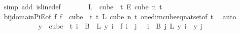 \begin{isabellebody}
\ {\isacharparenleft}{\kern0pt}simp\ add{\isacharcolon}{\kern0pt}\ is{\isacharunderscore}{\kern0pt}line{\isacharunderscore}{\kern0pt}def{\isacharparenright}{\kern0pt}\isanewline
\ \ \ \ \isamarkupfalse%
\ \isamarkupfalse%
\ {\isachardoublequoteopen}{\isacharquery}{\kern0pt}L\ {\isasymin}\ {\isacharparenleft}{\kern0pt}cube\ {}\ t{\isacharparenright}{\kern0pt}\ {\isasymrightarrow}\isactrlsub E\ {\isacharparenleft}{\kern0pt}cube\ n\ t{\isacharparenright}{\kern0pt}{\isachardoublequoteclose}\isanewline
\ \ \ \ \ \ \isamarkupfalse%
\ bij{\isacharunderscore}{\kern0pt}domain{\isacharunderscore}{\kern0pt}PiE{\isacharbrackleft}{\kern0pt}of\ {\isachardoublequoteopen}{\isacharparenleft}{\kern0pt}{\isasymlambda}f{\isachardot}{\kern0pt}\ f\ {}{\isacharparenright}{\kern0pt}{\isachardoublequoteclose}\ {\isachardoublequoteopen}{\isacharparenleft}{\kern0pt}cube\ {}\ t{\isacharparenright}{\kern0pt}{\isachardoublequoteclose}\ {\isachardoublequoteopen}{\isacharbraceleft}{\kern0pt}{\isachardot}{\kern0pt}{\isachardot}{\kern0pt}{\isacharless}{\kern0pt}t{\isacharbraceright}{\kern0pt}{\isachardoublequoteclose}\ {\isachardoublequoteopen}L{\isachardoublequoteclose}\ {\isachardoublequoteopen}cube\ n\ t{\isachardoublequoteclose}{\isacharbrackright}{\kern0pt}\ one{\isacharunderscore}{\kern0pt}dim{\isacharunderscore}{\kern0pt}cube{\isacharunderscore}{\kern0pt}eq{\isacharunderscore}{\kern0pt}nat{\isacharunderscore}{\kern0pt}set{\isacharbrackleft}{\kern0pt}of\ {\isachardoublequoteopen}t{\isachardoublequoteclose}{\isacharbrackright}{\kern0pt}\ \isamarkupfalse%
\ auto\isanewline
\ \ \isacommand{{\isacharbraceright}{\kern0pt}}\isamarkupfalse%
\isanewline
\ \ \isamarkupfalse%
\isanewline
\ \ \isacommand{{\isacharbraceleft}{\kern0pt}}\isamarkupfalse%
\isanewline
\ \ \ \ \isamarkupfalse%
\ {\isachardoublequoteopen}{\isasymforall}y\ {\isasymin}\ cube\ {}\ t{\isachardot}{\kern0pt}\ {\isacharparenleft}{\kern0pt}{\isasymforall}i\ {\isasymin}\ B\ {}{\isachardot}{\kern0pt}\ {\isacharquery}{\kern0pt}L\ y\ i\ {\isacharequal}{\kern0pt}\ {\isacharquery}{\kern0pt}f\ i{\isacharparenright}{\kern0pt}\ {\isasymand}\ {\isacharparenleft}{\kern0pt}{\isasymforall}j\ {\isacharless}{\kern0pt}\ {}{\isachardot}{\kern0pt}\ {\isasymforall}i\ {\isasymin}\ B\ j{\isachardot}{\kern0pt}\ {\isacharparenleft}{\kern0pt}{\isacharquery}{\kern0pt}L\ y{\isacharparenright}{\kern0pt}\ i\ {\isacharequal}{\kern0pt}\ y\ j{\isacharparenright}{\kern0pt}{\isachardoublequoteclose}\isanewline

\end{isabellebody}
